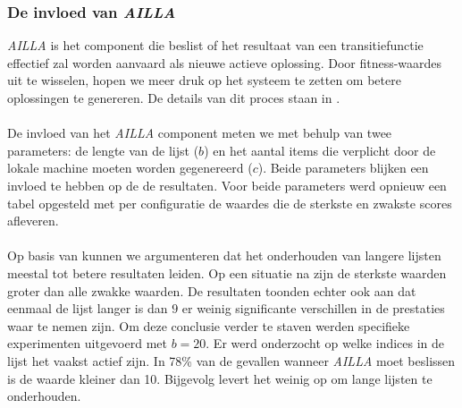 \subsubsection{De invloed van \emph{AILLA}}

\emph{AILLA} is het component die beslist of het resultaat van een transitiefunctie effectief zal worden aanvaard als nieuwe actieve oplossing. Door fitness-waardes uit te wisselen, hopen we meer druk op het systeem te zetten om betere oplossingen te genereren. De details van dit proces staan in .

\paragraph{}
De invloed van het \emph{AILLA} component meten we met behulp van twee parameters: de lengte van de lijst ($b$) en het aantal items die verplicht door de lokale machine moeten worden gegenereerd ($c$). Beide parameters blijken een invloed te hebben op de de resultaten. Voor beide parameters werd opnieuw een tabel opgesteld met per configuratie de waardes die de sterkste en zwakste scores afleveren.

\paragraph{}
Op basis van  kunnen we argumenteren dat het onderhouden van langere lijsten meestal tot betere resultaten leiden. Op een situatie na zijn de sterkste waarden groter dan alle zwakke waarden. De resultaten toonden echter ook aan dat eenmaal de lijst langer is dan $9$ er weinig significante verschillen in de prestaties waar te nemen zijn. Om deze conclusie verder te staven werden specifieke experimenten uitgevoerd met $b=20$. Er werd onderzocht op welke indices in de lijst het vaakst actief zijn. In 78\% van de gevallen wanneer \emph{AILLA} moet beslissen is de waarde kleiner dan 10. Bijgevolg levert het weinig op om lange lijsten te onderhouden.

